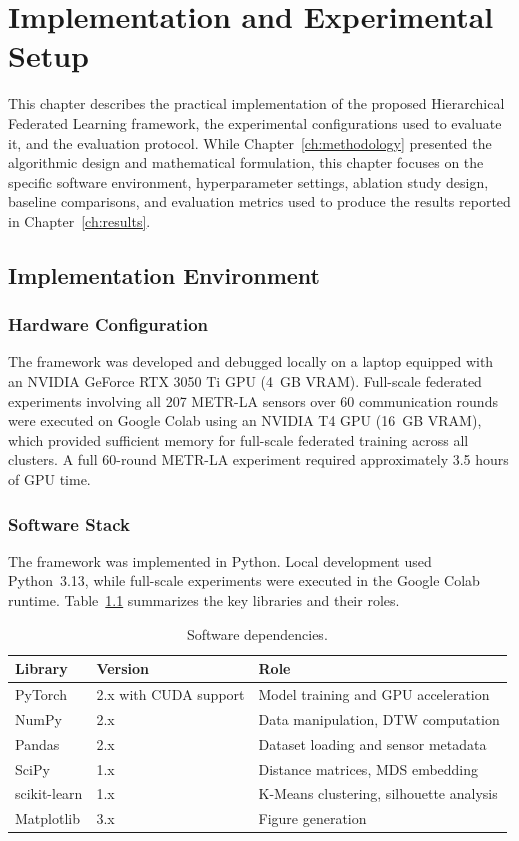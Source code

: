 \chapter{Implementation and Experimental Setup}
\label{ch:implementation}

This chapter describes the practical implementation of the proposed Hierarchical Federated Learning framework, the experimental configurations used to evaluate it, and the evaluation protocol. While Chapter~\ref{ch:methodology} presented the algorithmic design and mathematical formulation, this chapter focuses on the specific software environment, hyperparameter settings, ablation study design, baseline comparisons, and evaluation metrics used to produce the results reported in Chapter~\ref{ch:results}.

\section{Implementation Environment}
\label{sec:environment}

\subsection{Hardware Configuration}

The framework was developed and debugged locally on a laptop equipped with an NVIDIA GeForce RTX 3050 Ti GPU (4~GB VRAM). Full-scale federated experiments involving all 207 METR-LA sensors over 60 communication rounds were executed on Google Colab using an NVIDIA T4 GPU (16~GB VRAM), which provided sufficient memory for full-scale federated training across all clusters. A full 60-round METR-LA experiment required approximately 3.5 hours of GPU time.

\subsection{Software Stack}

The framework was implemented in Python. Local development used Python~3.13, while full-scale experiments were executed in the Google Colab runtime. Table~\ref{tab:software} summarizes the key libraries and their roles.

\begin{table}[H]
\centering
\caption{Software dependencies.}
\label{tab:software}
\begin{tabular}{lll}
\hline
\textbf{Library} & \textbf{Version} & \textbf{Role} \\
\hline
PyTorch & 2.x with CUDA support & Model training and GPU acceleration \\
NumPy & 2.x & Data manipulation, DTW computation \\
Pandas & 2.x & Dataset loading and sensor metadata \\
SciPy & 1.x & Distance matrices, MDS embedding \\
scikit-learn & 1.x & K-Means clustering, silhouette analysis \\
Matplotlib & 3.x & Figure generation \\
\hline
\end{tabular}
\end{table}

